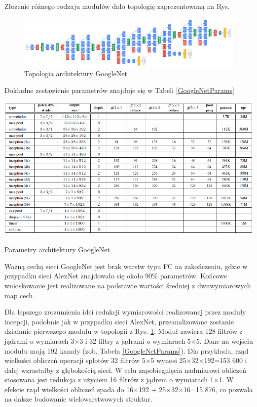 Złożenie różnego rodzaju modułów dało topologię zaprezentowaną na Rys.
\begin{figure}[h!]
	\centering
	\includegraphics[width=1\textwidth]{figures/GoogleNet.png}
	\caption{Topologia architektury GoogleNet}
	\label{GoogleNetTopo}
\end{figure}

Dokładne zestawienie parametrów znajduje się w Tabeli \ref{GoogleNetParams}

\begin{table}[h!]
	\centering
	\includegraphics[width=1\textwidth]{figures/GoogleNetparams.png}
	\caption{Parametry architektury GoogleNet}
	\label{GoogleNetParams}
\end{table}

Ważną cechą sieci GoogleNet jest brak warstw typu FC na zakończeniu, gdzie w przypadku sieci AlexNet znajdowało się około 90\% parametrów. Końcowe wnioskowanie jest realizowane na podstawie wartości średniej z dwuwymiarowych map cech.

Dla lepszego zrozumienia idei redukcji wymiarowości realizowanej przez moduły incepcji, podobnie jak w przypadku sieci AlexNet, przeanalizowane zostanie działanie pierwszego modułu w topologii z Rys. \ref{GoogleNetTopo}.
Moduł zawiera 128 filtrów z jądrami o wymiarach 3$\times$3 i 32 filtry z jądrami o wymiarach 5$\times$5. Dane na wejściu modułu mają 192 kanały (zob. Tabela \ref{GoogleNetParams}). Dla przykładu, rząd wielkości obliczeń operacji splotów 32 filtrów 5$\times$5 wynosi 25$\times$32$\times$192=153 600 i dalej wzrastałby z głębokością sieci. W celu zapobiegnięcia nadmiarowi obliczeń stosowana jest redukcja z użyciem 16 filtrów z jądrem o wymiarach 1$\times$1. W efekcie rząd wielkości obliczeń spada do 16$\times$192 +  25$\times$32$\times$16=15 876, co pozwala na dalsze budowanie wielowarstwowych struktur.

